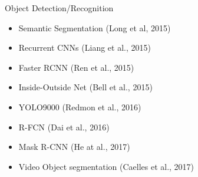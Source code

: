\begin{frame}
\begin{columns}
		\begin{column}{0.5\textwidth}
			\begin{overlayarea}{\textwidth}{\textheight}
				\vspace{-5mm}
				\begin{block}{Object Detection/Recognition}
					\begin{itemize}
						\item Semantic Segmentation (Long et al, 2015) \cite{DBLP:conf/cvpr/LongSD15}
						\item Recurrent CNNs (Liang et al., 2015) \cite{DBLP:conf/cvpr/LiangH15}
						\item Faster RCNN (Ren et al., 2015) \cite{DBLP:journals/pami/RenHG017}
						\item Inside-Outside Net (Bell et al., 2015) \cite{DBLP:journals/corr/BellZBG15}
						\item YOLO9000 (Redmon et al., 2016) \cite{DBLP:journals/corr/RedmonF16}
						\item R-FCN (Dai et al., 2016) \cite{DBLP:conf/nips/DaiLHS16}
						\item Mask R-CNN (He at al., 2017) \cite{DBLP:conf/iccv/HeGDG17}
						\item Video Object segmentation (Caelles et al., 2017) \cite{DBLP:conf/cvpr/CaellesMPLCG17}
					\end{itemize}
				\end{block}
			\end{overlayarea}
		\end{column}
	\end{columns}
\end{frame}




